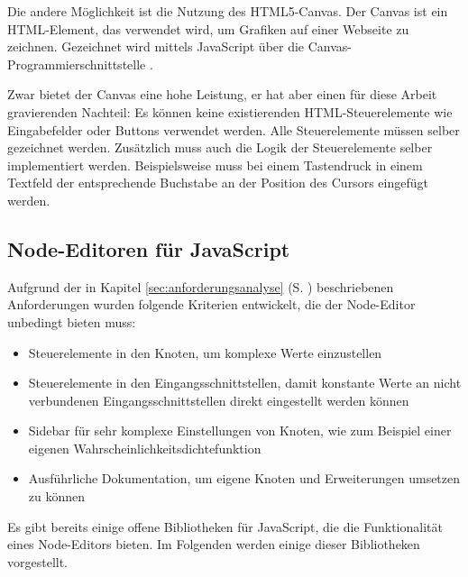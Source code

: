 Die andere Möglichkeit ist die Nutzung des HTML5-Canvas. Der Canvas ist ein HTML-Element, das verwendet wird, um Grafiken auf einer Webseite zu zeichnen. Gezeichnet wird mittels JavaScript über die Canvas-Programmierschnittstelle \cite{mdn:canvas}.

Zwar bietet der Canvas eine hohe Leistung, er hat aber einen für diese Arbeit gravierenden Nachteil: Es können keine existierenden \ac{HTML}-Steuerelemente wie Eingabefelder oder Buttons verwendet werden. Alle Steuerelemente müssen selber gezeichnet werden. Zusätzlich muss auch die Logik der Steuerelemente selber implementiert werden. Beispielsweise muss bei einem Tastendruck in einem Textfeld der entsprechende Buchstabe an der Position des Cursors eingefügt werden.

\subsection{Node-Editoren für JavaScript}

Aufgrund der in Kapitel \ref{sec:anforderungsanalyse} (S. \pageref{sec:anforderungsanalyse}) beschriebenen Anforderungen wurden folgende Kriterien entwickelt, die der Node-Editor unbedingt bieten muss:
\begin{itemize}
    \item Steuerelemente in den Knoten, um komplexe Werte einzustellen
    \item Steuerelemente in den Eingangsschnittstellen, damit konstante Werte an nicht verbundenen Eingangsschnittstellen direkt eingestellt werden können
    \item Sidebar für sehr komplexe Einstellungen von Knoten, wie zum Beispiel einer eigenen Wahrscheinlichkeitsdichtefunktion
    \item Ausführliche Dokumentation, um eigene Knoten und Erweiterungen umsetzen zu können
\end{itemize}

Es gibt bereits einige offene Bibliotheken für JavaScript, die die Funktionalität eines Node-Editors bieten. Im Folgenden werden einige dieser Bibliotheken vorgestellt.

